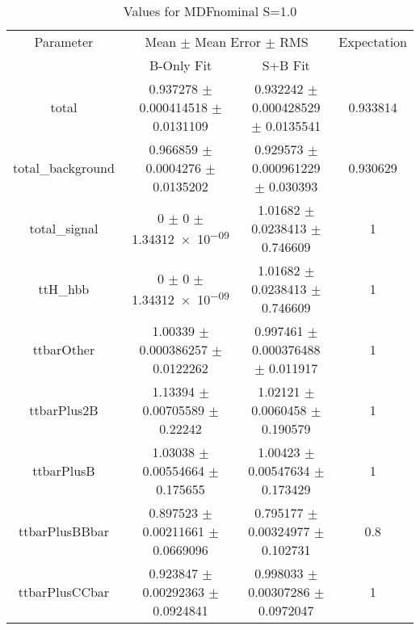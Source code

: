 \begin{table}
\centering
\caption{Values for MDFnominal S=1.0}
\begin{tabular}{cccc}
\toprule
Parameter & \multicolumn{2}{c}{Mean $\pm$ Mean Error $\pm$ RMS} & Expectation\\
 & B-Only Fit & S+B Fit & \\
\midrule
total & \num{0.937278} $\pm$ \num{0.000414518} $\pm$ \num{0.0131109} & \num{0.932242} $\pm$ \num{0.000428529} $\pm$ \num{0.0135541} & \num{0.933814}\\
total\_background & \num{0.966859} $\pm$ \num{0.0004276} $\pm$ \num{0.0135202} & \num{0.929573} $\pm$ \num{0.000961229} $\pm$ \num{0.030393} & \num{0.930629}\\
total\_signal & \num{0} $\pm$ \num{0} $\pm$ \num{1.34312e-09} & \num{1.01682} $\pm$ \num{0.0238413} $\pm$ \num{0.746609} & \num{1}\\
ttH\_hbb & \num{0} $\pm$ \num{0} $\pm$ \num{1.34312e-09} & \num{1.01682} $\pm$ \num{0.0238413} $\pm$ \num{0.746609} & \num{1}\\
ttbarOther & \num{1.00339} $\pm$ \num{0.000386257} $\pm$ \num{0.0122262} & \num{0.997461} $\pm$ \num{0.000376488} $\pm$ \num{0.011917} & \num{1}\\
ttbarPlus2B & \num{1.13394} $\pm$ \num{0.00705589} $\pm$ \num{0.22242} & \num{1.02121} $\pm$ \num{0.0060458} $\pm$ \num{0.190579} & \num{1}\\
ttbarPlusB & \num{1.03038} $\pm$ \num{0.00554664} $\pm$ \num{0.175655} & \num{1.00423} $\pm$ \num{0.00547634} $\pm$ \num{0.173429} & \num{1}\\
ttbarPlusBBbar & \num{0.897523} $\pm$ \num{0.00211661} $\pm$ \num{0.0669096} & \num{0.795177} $\pm$ \num{0.00324977} $\pm$ \num{0.102731} & \num{0.8}\\
ttbarPlusCCbar & \num{0.923847} $\pm$ \num{0.00292363} $\pm$ \num{0.0924841} & \num{0.998033} $\pm$ \num{0.00307286} $\pm$ \num{0.0972047} & \num{1}\\
\bottomrule
\end{tabular}
\end{table}